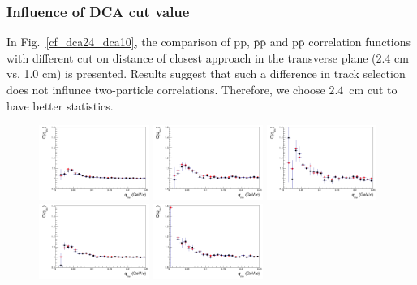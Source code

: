 \subsubsection{Influence of DCA cut value}
In Fig.~\ref{cf_dca24_dca10}, the comparison of pp, $\bar{\mathrm{p}}\bar{\mathrm{p}}$ and p$\bar{\mathrm{p}}$ correlation functions with different cut on distance of closest approach in the transverse plane (2.4 cm vs. 1.0 cm) is presented. Results suggest that such a difference in track selection does not influnce two-particle correlations. Therefore, we choose $2.4$~cm cut to have better statistics.
\begin{figure}%
  \centering
  \includegraphics[width=0.32\textwidth]{cmp_dcatpconly11h_dca24_dca10_cen0/PP}
  \includegraphics[width=0.32\textwidth]{cmp_dcatpconly11h_dca24_dca10_cen2/PP}
  \includegraphics[width=0.32\textwidth]{cmp_dcatpconly11h_dca24_dca10_cen4/PP}
  \includegraphics[width=0.32\textwidth]{cmp_dcatpconly11h_dca24_dca10_cen0/APAP}
  \includegraphics[width=0.32\textwidth]{cmp_dcatpconly11h_dca24_dca10_cen2/APAP}

\end{figure}
